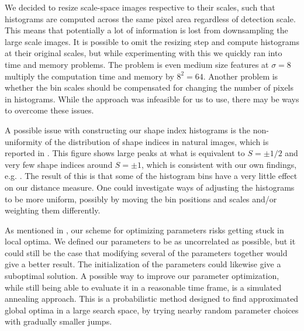 \documentclass[thesis.tex]{subfiles}
\begin{document}
We decided to resize scale-space images respective to their scales, such that histograms are computed across the same pixel area regardless of detection scale. This means that potentially a lot of information is lost from downsampling the large scale images. It is possible to omit the resizing step and compute histograms at their original scales, but while experimenting with this we quickly ran into time and memory problems. The problem is even medium size features at $\sigma = 8$ multiply the computation time and memory by $8^2 = 64$. Another problem is whether the bin scales should be compensated for changing the number of pixels in histograms. While the approach was infeasible for us to use, there may be ways to overcome these issues.

A possible issue with constructing our shape index histograms is the non-uniformity of the distribution of shape indices in natural images, which is reported in \citep[Fig. 3]{lillholm2009statistics}. This figure shows large peaks at what is equivalent to $S = \pm 1/2$ and very few shape indices around $S = \pm 1$, which is consistent with our own findings, e.g. . The result of this is that some of the histogram bins have a very little effect on our distance measure. One could investigate ways of adjusting the histograms to be more uniform, possibly by moving the bin positions and scales and/or weighting them differently.

As mentioned in , our scheme for optimizing parameters risks getting stuck in local optima. We defined our parameters to be as uncorrelated as possible, but it could still be the case that modifying several of the parameters together would give a better result. The initialization of the parameters could likewise give a suboptimal solution. A possible way to improve our parameter optimization, while still being able to evaluate it in a reasonable time frame, is a simulated annealing approach. This is a probabilistic method designed to find approximated global optima in a large search space, by trying nearby random parameter choices with gradually smaller jumps. 
\end{document}
